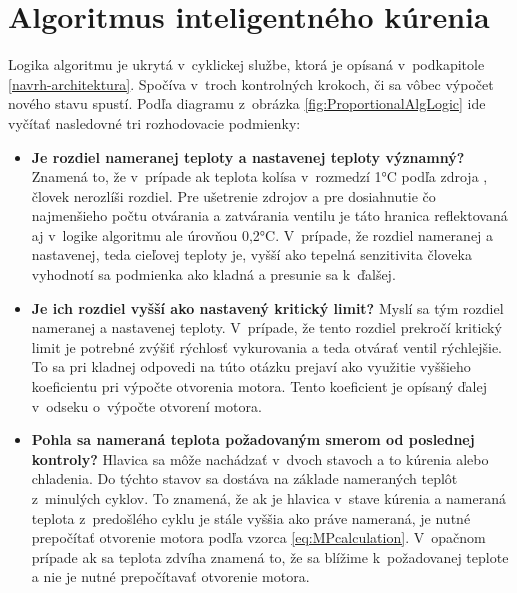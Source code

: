 \section{Algoritmus inteligentného  kúrenia}\label{navrh-algo}
Logika algoritmu je ukrytá v~cyklickej službe, ktorá je opísaná v~podkapitole \ref{navrh-architektura}. 
Spočíva v~troch kontrolných krokoch, či sa vôbec výpočet nového stavu spustí. Podľa diagramu z~obrázka \ref{fig:ProportionalAlgLogic} ide vyčítať nasledovné tri rozhodovacie podmienky:
\begin{itemize}
    \item \textbf{Je rozdiel nameranej teploty a nastavenej teploty významný?} Znamená to, že v~prípade ak teplota kolísa v~rozmedzí 1°C podľa zdroja \cite{TemperatureSensivity}, človek nerozlíši rozdiel. 
    Pre ušetrenie zdrojov a pre dosiahnutie čo najmenšieho počtu otvárania a zatvárania ventilu je táto hranica reflektovaná aj v~logike algoritmu ale úrovňou 0,2°C. 
    V~prípade, že rozdiel nameranej a nastavenej, teda cieľovej teploty je, vyšší ako tepelná senzitivita človeka vyhodnotí sa podmienka ako kladná a presunie sa k~ďalšej. 
    \item \textbf{Je ich rozdiel vyšší ako nastavený kritický limit?} Myslí sa tým rozdiel nameranej a nastavenej teploty. 
    V~prípade, že tento rozdiel prekročí kritický limit je potrebné zvýšiť rýchlosť vykurovania a teda otvárať ventil rýchlejšie. To sa pri kladnej odpovedi na túto otázku prejaví ako využitie vyššieho koeficientu pri výpočte otvorenia motora. Tento koeficient je opísaný ďalej v~odseku o~výpočte otvorení motora.
    \item \textbf{Pohla sa nameraná teplota požadovaným smerom od poslednej kontroly?} Hlavica sa môže nachádzať v~dvoch stavoch a to kúrenia alebo chladenia. 
    Do týchto stavov sa dostáva na základe nameraných teplôt z~minulých cyklov. 
    To znamená, že ak je hlavica v~stave kúrenia a nameraná teplota z~predošlého cyklu je stále vyššia ako práve nameraná, je nutné prepočítať otvorenie motora podľa vzorca \ref{eq:MPcalculation}.
    V~opačnom prípade ak sa teplota zdvíha znamená to, že sa blížime k~požadovanej teplote a nie je nutné prepočítavať otvorenie motora.
\end{itemize}
